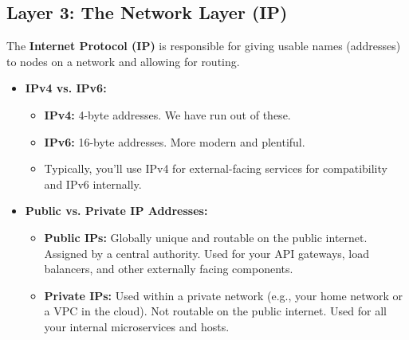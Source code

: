 \documentclass{article}
\begin{document}
\subsection{Layer 3: The Network Layer (IP)}
The \textbf{Internet Protocol (IP)} is responsible for giving usable names (addresses) to nodes on a network and allowing for routing.
\begin{itemize}
    \item \textbf{IPv4 vs. IPv6:}
    \begin{itemize}
        \item \textbf{IPv4:} 4-byte addresses. We have run out of these.
        \item \textbf{IPv6:} 16-byte addresses. More modern and plentiful.
        \item Typically, you'll use IPv4 for external-facing services for compatibility and IPv6 internally.
    \end{itemize}
    \item \textbf{Public vs. Private IP Addresses:}
    \begin{itemize}
        \item \textbf{Public IPs:} Globally unique and routable on the public internet. Assigned by a central authority. Used for your API gateways, load balancers, and other externally facing components.
        \item \textbf{Private IPs:} Used within a private network (e.g., your home network or a VPC in the cloud). Not routable on the public internet. Used for all your internal microservices and hosts.
    \end{itemize}
\end{itemize}
\end{document}
